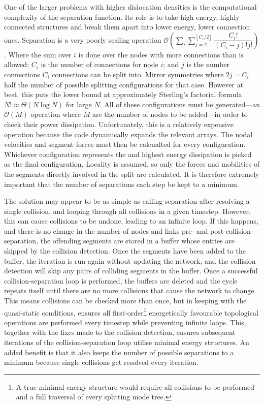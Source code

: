 One of the larger problems with higher dislocation densities is the computational complexity of the separation function. Its role is to take high energy, highly connected structures and break them apart into lower energy, lower connection ones. Separation is a very poorly scaling operation $\mathcal{O}\left(\sum\limits_{i}\sum\limits_{j=2}^{\left\lfloor C_i/2 \right\rfloor} \dfrac{C_i!}{(C_i-j)! j!}\right)$. Where the sum over $i$ is done over the nodes with more connections than is allowed; $C_i$ is the number of connections for node $i$; and $j$ is the number connections $C_i$ connections can be split into. Mirror symmetries where $2j = C_i$ half the number of possible splitting configurations for that case. However at best, this puts the lower bound at approximately Sterling's factorial formula $N! \approx \mathcal{\Theta}(N\log{N})$ for large $N$. All of these configurations must be generated---an $\mathcal{O}(M)$ operation where $M$ are the number of nodes to be added---in order to check their power dissipation. Unfortunately, this is a relatively expensive operation because the code dynamically expands the relevant arrays. The nodal velocities and segment forces must then be calcualted for every configuration. Whichever configuration represents the and highest energy dissipation is picked as the final configuration. Locality is assumed, so only the forces and mobilities of the segments directly involved in the split are calculated. It is therefore extremely important that the number of separations each step be kept to a minimum.

The solution may appear to be as simple as calling separation after resolving a single collision, and looping through all collisions in a given timestep. However, this can cause collisions to be undone, leading to an infinite loop. If this happens, and there is no change in the number of nodes and links pre- and post-collision-separation, the offending segments are stored in a buffer whose entries are skipped by the collision detection. Once the segments have been added to the buffer, the iteration is run again without updating the network, and the collision detection will skip any pairs of colliding segments in the buffer. Once a successful collision-separation loop is performed, the buffers are deleted and the cycle repeats itself until there are no more collisions that cause the network to change. This means collisions can be checked more than once, but in keeping with the quasi-static conditions, ensures all first-order\footnote{A true minimal energy structure would require all collisions to be performed and a full traversal of every splitting mode tree.} energetically favourable topological operations are performed every timestep while preventing infinite loops. This, together with the fixes made to the collision detection, ensures subsequent iterations of the collision-separation loop utilise minimal energy structures. An added benefit is that it also keeps the number of possible separations to a minimum because single collisions get resolved every iteration.

